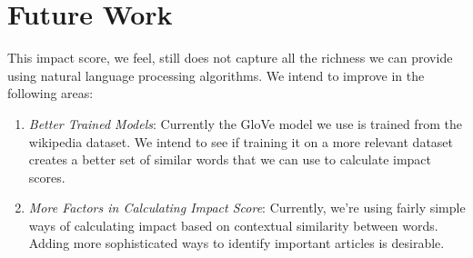 \documentclass{article}
\begin{document}
\section {Future Work}
This impact score, we feel, still does not capture all the richness we can provide using natural language processing algorithms. We intend to improve in the following areas:
\begin {enumerate}
\item \textit {Better Trained Models}: Currently the GloVe model we use is trained from the wikipedia dataset. We intend to see if training it on a more relevant dataset creates a better set of similar words that we can use to calculate impact scores.
\item \textit {More Factors in Calculating Impact Score}: Currently, we're using fairly simple ways of calculating impact based on contextual similarity between words. Adding more sophisticated ways to identify important articles is desirable.
\end {enumerate}
\end{document}
